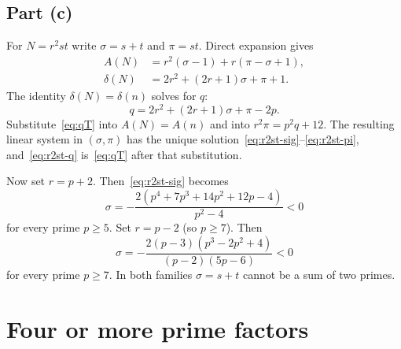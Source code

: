 \documentclass[11pt,reqno]{amsart}
\theoremstyle{definition}
\begin{document}
\subsection{Part (c)}
For \(N=r^2st\) write \(\sigma=s+t\) and \(\pi=st\). Direct expansion gives
\begin{align}
\label{eq:Ar2st}
A(N)&=r^2(\sigma-1)+r(\pi-\sigma+1),\\
\label{eq:Tr2st}
\delta(N)&=2r^2+(2r+1)\sigma+\pi+1.
\end{align}
The identity \(\delta(N)=\delta(n)\) solves for \(q\):
\begin{equation}
\label{eq:qT}
q=2r^2+(2r+1)\sigma+\pi-2p.
\end{equation}
Substitute~\eqref{eq:qT} into \(A(N)=A(n)\) and into \(r^2\pi=p^2q+12\). The resulting linear system in \((\sigma,\pi)\) has the unique solution~\eqref{eq:r2st-sig}--\eqref{eq:r2st-pi}, and~\eqref{eq:r2st-q} is~\eqref{eq:qT} after that substitution.

Now set \(r=p+2\). Then~\eqref{eq:r2st-sig} becomes
\[
\sigma=-\frac{2(p^4+7p^3+14p^2+12p-4)}{p^2-4}<0
\]
for every prime \(p\ge 5\). Set \(r=p-2\) (so \(p\ge 7\)). Then
\[
\sigma=-\frac{2(p-3)(p^3-2p^2+4)}{(p-2)(5p-6)}<0
\]
for every prime \(p\ge 7\). In both families \(\sigma=s+t\) cannot be a sum of two primes.

\section{Four or more prime factors}
\label{sec:omega}
\end{document}
